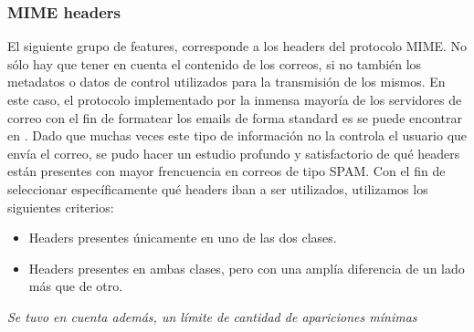 \subsubsection*{MIME headers}
El siguiente grupo de features, corresponde a los headers del protocolo MIME. No sólo hay que tener en cuenta el contenido de los correos, si no también los metadatos o datos de control utilizados para la transmisión de los mismos. 
En este caso, el protocolo implementado por la inmensa mayoría de los servidores de correo con el fin de formatear los emails de forma standard es se puede encontrar en \cite{mimestandar}.
Dado que muchas veces este tipo de información no la controla el usuario que envía el correo, se pudo hacer un estudio profundo y satisfactorio de qué headers están presentes con mayor frencuencia en correos de tipo SPAM.
Con el fin de seleccionar específicamente qué headers iban a ser utilizados, utilizamos los siguientes criterios:
\begin{itemize}
    \item Headers presentes únicamente en uno de las dos clases.
    \item Headers presentes en ambas clases, pero con una amplía diferencia de un lado más que de otro. 
\end{itemize}
\textit{Se tuvo en cuenta además, un límite de cantidad de apariciones mínimas}

